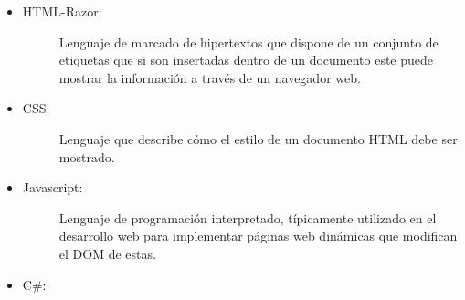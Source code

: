 
\begin{itemize}
    \item   \begin{description}
                \item[HTML-Razor:] Lenguaje de marcado de hipertextos que dispone de un conjunto de etiquetas que si son insertadas dentro de un documento este puede mostrar la información a través de un navegador web. 
            \end{description}

    \item   \begin{description}
                \item[CSS:] Lenguaje que describe cómo el estilo de un documento HTML debe ser mostrado. 
            \end{description}

    \item   \begin{description}
                \item[Javascript:] Lenguaje de programación interpretado, típicamente utilizado en el desarrollo web para implementar páginas web dinámicas que modifican el DOM de estas.
            \end{description}

    \item   \begin{description}
                \item[C\#:] 
            \end{description}
    
\end{itemize}